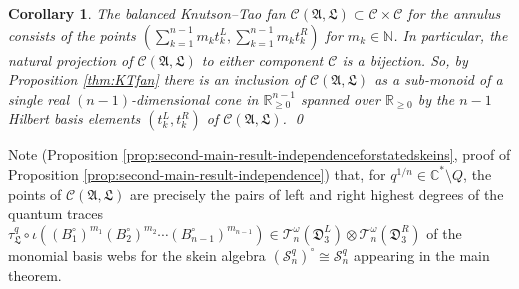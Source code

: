 \documentclass[12pt,
	]{amsart}
\newtheorem{corollary}[theorem]{Corollary}
\theoremstyle{definition}
\newcommand{\mbb}[1]{\mathbb{#1}}
\newcommand{\mcal}[1]{\mathcal{#1}}
\newcommand{\mfrak}[1]{\mathfrak{#1}}
\newcommand{\lp}{\left(}\newcommand{\rp}{\right)}
\newcommand{\unbased}[1]{#1^\circ}
\newcommand{\nnegZ}{\mbb{N}}
\newcommand{\R}{\mbb{R}}
\newcommand{\C}{\mbb{C}}
\newcommand{\sC}{\C^\ast}
\newcommand{\sk}{\mcal{S}_n^q}
\newcommand{\usk}{\unbased{\lp\sk\rp}}
\newcommand{\ann}{\mfrak{A}}
\newcommand{\badset}{Q}
\newcommand{\qroot}{q^{1/n}}
\newcommand{\ttriang}{\mfrak{D}_3}
\newcommand{\idealtriang}{\mfrak{L}}
\newcommand{\wroot}{\omega}
\newcommand{\qtorus}[1]{\mcal{T}_n^\wroot(#1)}
\newcommand{\qtr}{\tau^q_\idealtriang}
\newcommand{\incl}{\iota}
\newcommand{\fan}{\mcal{C}}
\begin{document}
\begin{corollary}\label{cor:ktfanofannulus}
The balanced Knutson--Tao fan $\fan(\ann,\idealtriang)\subset\fan\times\fan$ for the annulus consists of the points $(\sum_{k=1}^{n-1} m_k t_k^L,\sum_{k=1}^{n-1} m_k t_k^R)$ for $m_k\in\nnegZ$.  In particular, the natural projection of $\fan(\ann,\idealtriang)$ to either component $\fan$ is a bijection.  So, by Proposition {\upshape\ref{thm:KTfan}} there is an inclusion of $\fan(\ann,\idealtriang)$ as a sub-monoid of a single real $(n-1)$-dimensional cone in $\R_{\geq0}^{n-1}$ spanned over $\R_{\geq0}$ by the $n-1$ Hilbert basis elements $(t_k^L,t_k^R)$ of $\fan(\ann,\idealtriang)$.  \qed
\end{corollary}

Note (Proposition \ref{prop:second-main-result-independenceforstatedskeins}, proof of Proposition \ref{prop:second-main-result-independence}) that, for $\qroot\in\sC\setminus\badset$, the points of $\fan(\ann,\idealtriang)$ are precisely the pairs of left and right highest degrees of the quantum traces $\qtr\circ\incl((\unbased{B}_{1})^{m_1}(\unbased{B}_{2})^{m_2}\cdots(\unbased{B}_{n-1})^{m_{n-1}})\in\qtorus{\ttriang^L}\otimes\qtorus{\ttriang^R}$ of the monomial basis webs for the skein algebra $\usk\cong\sk$ appearing in the main theorem.  
\end{document}
